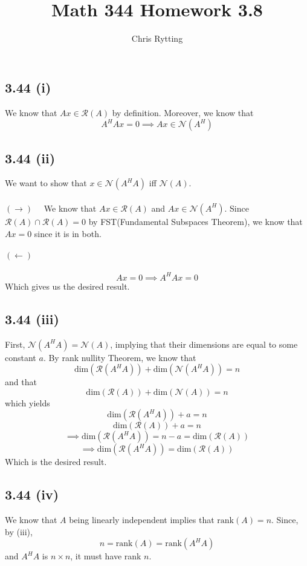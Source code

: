 \documentclass[letterpaper,12pt]{article}
\theoremstyle{definition}
\begin{document}
\title{Math 344 Homework 3.8}
\author{Chris Rytting}
\maketitle

\subsection*{3.44 (i)}


We know that $Ax \in \mathscr{R}(A)$ by definition. Moreover, we know that 
\[ A^HAx = 0 \implies Ax \in \mathscr{N}(A^H)\]

\subsection*{3.44 (ii)}
We want to show that $x \in \mathscr{N}(A^HA)$ iff $\mathscr{N}(A)$.\\\\
$(\rightarrow) \quad$ We know that $Ax \in \mathscr{R}(A)$ and $Ax \in \mathscr{N}(A^H)$. Since 
$\mathscr{R}(A) \cap \mathscr{R}(A) = 0$ by FST(Fundamental Subspaces Theorem), we know that $Ax=0$ since it is in both.
\\\\
$(\leftarrow)$\\\\
\[Ax = 0 \implies A^HAx = 0 \]
Which gives us the desired result.

\subsection*{3.44 (iii)}
First, $\mathscr{N}(A^HA) = \mathscr{N}(A)$, implying that their dimensions are equal to some constant $a$. 
By rank nullity Theorem, we know that 
\[\text{dim}(\mathscr{R}(A^HA)) + \text{dim}(\mathscr{N}(A^HA)) = n \]
and that
\[\text{dim}(\mathscr{R}(A)) + \text{dim}(\mathscr{N}(A)) = n \]
which yields
\[\text{dim}(\mathscr{R}(A^HA)) + a = n \]
\[\text{dim}(\mathscr{R}(A)) + a = n \]
\[\implies  \text{dim}(\mathscr{R}(A^HA)) = n - a = 
\text{dim}(\mathscr{R}(A))  \]
\[\implies  \text{dim}(\mathscr{R}(A^HA)) = 
\text{dim}(\mathscr{R}(A))  \]
Which is the desired result.

\subsection*{3.44 (iv)}
We know that $A$ being linearly independent implies that $\text{rank}(A) = n$. Since, by (iii), 
\[ n = \text{rank}(A) = \text{rank}(A^HA)\]
and $A^HA$ is $n\times n$, it must have rank $n$.
\end{document}
